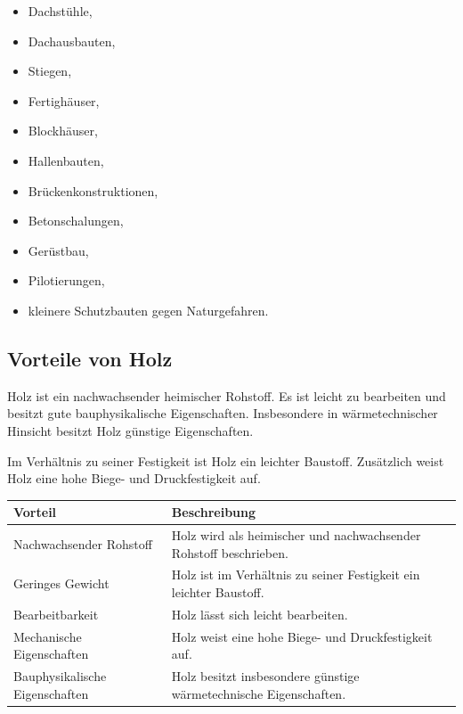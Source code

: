 \documentclass[
  12pt,
  a4paper,
  oneside
]{scrreprt}
\begin{document}
\begin{itemize}
  \item Dachstühle,
  \item Dachausbauten,
  \item Stiegen,
  \item Fertighäuser,
  \item Blockhäuser,
  \item Hallenbauten,
  \item Brückenkonstruktionen,
  \item Betonschalungen,
  \item Gerüstbau,
  \item Pilotierungen,
  \item kleinere Schutzbauten gegen Naturgefahren.
\end{itemize}



\subsection{Vorteile von Holz}

Holz ist ein nachwachsender heimischer Rohstoff. Es ist leicht zu
bearbeiten und besitzt gute bauphysikalische Eigenschaften.
Insbesondere in wärmetechnischer Hinsicht besitzt Holz günstige
Eigenschaften. 

Im Verhältnis zu seiner Festigkeit ist Holz ein leichter Baustoff.
Zusätzlich weist Holz eine hohe Biege- und Druckfestigkeit auf.


\begin{longtable}{
  >{\raggedright\arraybackslash}p{}
  >{\raggedright\arraybackslash}p{}
}
\toprule
\textbf{Vorteil} &
\textbf{Beschreibung} \\
\midrule
\endhead

Nachwachsender Rohstoff &
Holz wird als heimischer und nachwachsender Rohstoff beschrieben. \\

Geringes Gewicht &
Holz ist im Verhältnis zu seiner Festigkeit ein leichter Baustoff. \\

Bearbeitbarkeit &
Holz lässt sich leicht bearbeiten. \\

Mechanische Eigenschaften &
Holz weist eine hohe Biege- und Druckfestigkeit auf. \\

Bauphysikalische Eigenschaften &
Holz besitzt insbesondere günstige wärmetechnische Eigenschaften. \\

\bottomrule
\end{longtable}
\end{document}
